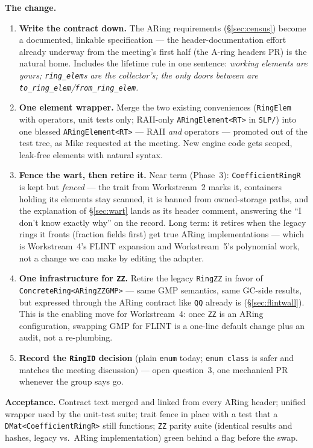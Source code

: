 \documentclass[11pt,oneside]{report}
\newcommand{\code}[1]{\textcolor{m2code}{\texttt{#1}}}
\newcommand{\file}[1]{\textcolor{m2file}{\texttt{#1}}}
\begin{document}
\textbf{The change.}
\begin{enumerate}
\item \textbf{Write the contract down.} The ARing requirements
  (\S\ref{sec:census}) become a documented, linkable specification ---
  the header-documentation effort already underway from the meeting's
  first half (the A-ring headers PR) is the natural home. Includes the
  lifetime rule in one sentence: \emph{working elements are yours;
  \code{ring\_elem}s are the collector's; the only doors between are
  \code{to\_ring\_elem}/\code{from\_ring\_elem}.}
\item \textbf{One element wrapper.} Merge the two existing conveniences
  (\code{RingElem} with operators, unit tests only; RAII-only
  \code{ARingElement<RT>} in \file{SLP/}) into one blessed
  \code{ARingElement<RT>} --- RAII \emph{and} operators --- promoted out
  of the test tree, as Mike requested at the meeting. New engine code gets
  scoped, leak-free elements with natural syntax.
\item \textbf{Fence the wart, then retire it.} Near term (Phase~3):
  \code{CoefficientRingR} is kept but \emph{fenced} --- the trait from
  Workstream~2 marks it, containers holding its elements stay scanned, it
  is banned from owned-storage paths, and the explanation of
  \S\ref{sec:wart} lands as its header comment, answering the ``I don't
  know exactly why'' on the record. Long term: it retires when the legacy
  rings it fronts (fraction fields first) get true ARing implementations
  --- which is Workstream~4's FLINT expansion and Workstream~5's
  polynomial work, not a change we can make by editing the adapter.
\item \textbf{One infrastructure for \code{ZZ}.} Retire the legacy
  \code{RingZZ} in favor of \code{ConcreteRing<ARingZZGMP>} --- same GMP
  semantics, same GC-side results, but expressed through the ARing
  contract like \code{QQ} already is (\S\ref{sec:flintwall}). This is the
  enabling move for Workstream~4: once \code{ZZ} is an ARing
  configuration, swapping GMP for FLINT is a one-line default change plus
  an audit, not a re-plumbing.
\item \textbf{Record the \code{RingID} decision} (plain \code{enum} today;
  \code{enum class} is safer and matches the meeting discussion) --- open
  question~3, one mechanical PR whenever the group says go.
\end{enumerate}

\textbf{Acceptance.} Contract text merged and linked from every ARing
header; unified wrapper used by the unit-test suite; trait fence in place
with a test that a \code{DMat<CoefficientRingR>} still functions; \code{ZZ}
parity suite (identical results and hashes, legacy vs.\ ARing
implementation) green behind a flag before the swap.
\end{document}
